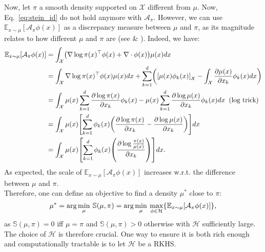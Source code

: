 \documentclass[runningheads,a4paper]{llncs}
\newcommand{\E}{\mathbb{E}}
\newcommand{\Sr}{\mathbb{S}}
\newcommand{\X}{\mathcal{X}}
\newcommand{\A}{\mathcal{A}}
\newcommand{\Hr}{\mathcal{H}}
\newcommand{\diff}[2]{\frac{\partial #1}{\partial #2}}
\DeclarePairedDelimiter{\pare}{(}{)}
\DeclarePairedDelimiter{\bra}{\{}{\}}
\DeclarePairedDelimiter{\sq}{[}{]}
\begin{document}
Now, let $\pi$ a smooth density supported on $\X$ different from $\mu$. Now, Eq.~\ref{eq:stein_id} do not hold
anymore with $\A_\pi$. However, we can use $\E_{x \sim \mu}[\A_\pi \phi (x)]$ as a discrepancy
measure between $\mu$ and $\pi$, as its magnitude relates to how different $\mu$ and $\pi$ are
(see \cite{https://doi.org/10.48550/arxiv.1608.04471} \& \cite{https://doi.org/10.48550/arxiv.1704.07520}).
Indeed, we have:
\begin{equation}
  \begin{split}
    \E_{x \sim \mu}[\A_\pi \phi (x)] &=
      \int_\X \pare*{ \nabla \log \pi(x)^\top \phi(x) + \nabla \cdot \phi(x) } \mu(x) dx \\
    &= \int_\X \nabla \log \pi(x)^\top \phi(x) \mu(x) dx +
    \sum_{k=1}^d \pare*{ \sq*{\mu(x) \phi_k(x)}_\X - \int_\X \diff{\mu(x)}{x_k} \phi_k(x) dx} \\
    &= \int_\X  \mu(x) \sum_{k=1}^d \diff{\log \pi(x)}{x_k}\phi_k(x) -
    \mu(x) \sum_{k=1}^d \diff{\log \mu(x)}{x_k} \phi_k(x) dx \;\; \text{(log trick)} \\
    &= \int_\X  \mu(x) \sq*{ \sum_{k=1}^d \phi_k(x) \pare*{ \diff{\log \pi(x)}{x_k} - \diff{\log \mu(x)}{x_k}}} dx \\
    &= \int_\X  \mu(x) \sq*{ \sum_{k=1}^d \phi_k(x) \pare*{ \diff{\log \frac{\pi(x)}{\mu(x)}}{x_k}}} dx.
  \end{split}
\end{equation}
As expected, the scale of $\E_{x \sim \mu}[\A_\pi \phi (x)]$ increases w.r.t. the difference between $\mu$ and $\pi$.\\

Therefore, one can define an objective to find a density $\mu^*$ close to $\pi$:
\begin{equation}
  \mu^* = \arg\min_{\mu} \: \Sr(\mu, \pi) =
    \arg\min_{\mu} \: \max_{\phi \in \Hr} \bra*{ \E_{x \sim \mu}[\A_\pi \phi (x)] },
  \label{eq:stein_obj}
\end{equation}
as $\Sr(\mu, \pi) = 0$ iff $\mu = \pi$ and $\Sr(\mu, \pi) > 0$ otherwise with $\Hr$ sufficiently large.
The choice of $\Hr$ is therefore crucial. One way to ensure it is both rich enough and computationally tractable
is to let $\Hr$ be a RKHS.
\end{document}
